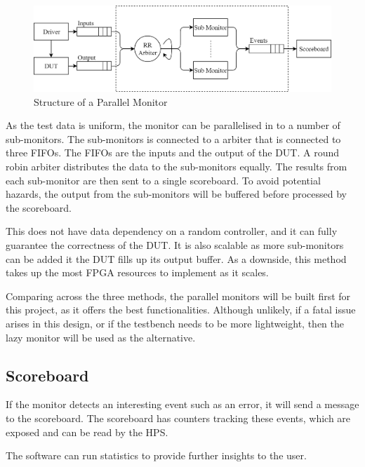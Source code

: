 \begin{figure}[H]
  \centering
  \includegraphics[width=15cm]{img/ParMon}
  \caption{Structure of a Parallel Monitor}
  \label{ParMon}
\end{figure}

As the test data is uniform, the monitor can be parallelised in to a number of sub-monitors.
The sub-monitors is connected to a arbiter that is connected to three FIFOs.
The FIFOs are the inputs and the output of the DUT.
A round robin arbiter distributes the data to the sub-monitors equally.
The results from each sub-monitor are then sent to a single scoreboard.
To avoid potential hazards, the output from the sub-monitors will be buffered before processed by the scoreboard.

This does not have data dependency on a random controller, and it can fully guarantee the correctness of the DUT.
It is also scalable as more sub-monitors can be added it the DUT fills up its output buffer.
As a downside, this method takes up the most FPGA resources to implement as it scales.

Comparing across the three methods, the parallel monitors will be built first for this project, as it offers the best functionalities.
Although unlikely, if a fatal issue arises in this design, or if the testbench needs to be more lightweight, then the lazy monitor will be used as the alternative.

\subsection{Scoreboard}

If the monitor detects an interesting event such as an error, it will send a message to the scoreboard.
The scoreboard has counters tracking these events, which are exposed and can be read by the HPS.

The software can run statistics to provide further insights to the user.
